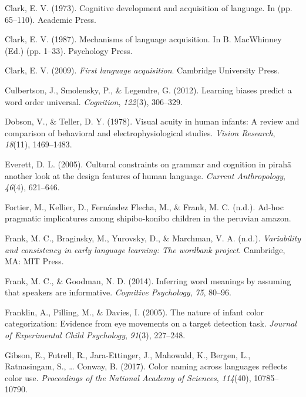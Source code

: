 \documentclass[
  english,
  ,man,floatsintext]{apa6}
\begin{document}
\leavevmode\hypertarget{ref-clark1973}{}%
Clark, E. V. (1973). Cognitive development and acquisition of language. In (pp. 65--110). Academic Press.

\leavevmode\hypertarget{ref-clark1987}{}%
Clark, E. V. (1987). Mechanisms of language acquisition. In B. MacWhinney (Ed.) (pp. 1--33). Psychology Press.

\leavevmode\hypertarget{ref-clark2009}{}%
Clark, E. V. (2009). \emph{First language acquisition}. Cambridge University Press.

\leavevmode\hypertarget{ref-culbertson2012}{}%
Culbertson, J., Smolensky, P., \& Legendre, G. (2012). Learning biases predict a word order universal. \emph{Cognition}, \emph{122}(3), 306--329.

\leavevmode\hypertarget{ref-dobson1978}{}%
Dobson, V., \& Teller, D. Y. (1978). Visual acuity in human infants: A review and comparison of behavioral and electrophysiological studies. \emph{Vision Research}, \emph{18}(11), 1469--1483.

\leavevmode\hypertarget{ref-everett2005}{}%
Everett, D. L. (2005). Cultural constraints on grammar and cognition in pirahã another look at the design features of human language. \emph{Current Anthropology}, \emph{46}(4), 621--646.

\leavevmode\hypertarget{ref-fortierunderreview}{}%
Fortier, M., Kellier, D., Fernández Flecha, M., \& Frank, M. C. (n.d.). Ad-hoc pragmatic implicatures among shipibo-konibo children in the peruvian amazon.

\leavevmode\hypertarget{ref-frank2020}{}%
Frank, M. C., Braginsky, M., Yurovsky, D., \& Marchman, V. A. (n.d.). \emph{Variability and consistency in early language learning: The wordbank project}. Cambridge, MA: MIT Press.

\leavevmode\hypertarget{ref-frank2014}{}%
Frank, M. C., \& Goodman, N. D. (2014). Inferring word meanings by assuming that speakers are informative. \emph{Cognitive Psychology}, \emph{75}, 80--96.

\leavevmode\hypertarget{ref-franklin2005}{}%
Franklin, A., Pilling, M., \& Davies, I. (2005). The nature of infant color categorization: Evidence from eye movements on a target detection task. \emph{Journal of Experimental Child Psychology}, \emph{91}(3), 227--248.

\leavevmode\hypertarget{ref-gibson2017}{}%
Gibson, E., Futrell, R., Jara-Ettinger, J., Mahowald, K., Bergen, L., Ratnasingam, S., \ldots{} Conway, B. (2017). Color naming across languages reflects color use. \emph{Proceedings of the National Academy of Sciences}, \emph{114}(40), 10785--10790.
\end{document}
